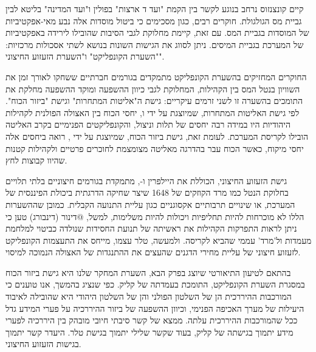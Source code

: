 קיים קונצנזוס נרחב בנוגע לקשר  בין הקמת "ועד ד ארצות" בפולין ו"ועד המדינה" בליטא לבין גביית מס הגולגולת. חוקרים רבים, כגון מסכימים כי ביטול מוסדות אלה נבע מאי-אפקטיביות של המוסדות בגביית המס. עם זאת, קיימת מחלוקת לגבי הסיבות שהובילו לירידה באפקטיביות של המערכת בגביית המיסים. ניתן לסווג את הגישות השונות בנושא לשתי אסכולות מרכזיות: "השערת הקונפליקט" ו"השערת הזעזוע החיצוני".

החוקרים המחזיקים בהשערת הקונפליקט מתמקדים בגורמים חברתיים ששחקו לאורך זמן את השוויון בנטל המס בין הקהילות, המחלוקת לגבי כיוון ההשפעה ומוקד ההשפעה מחלקת את התומכים בהשערה זו לשני זרמים עיקריים: גישת ה"אליטות המתחרות" וגישת "ביזור הכוח". לפי גישת האליטות המתחרות, שמיוצגת על ידי \cite{teller_early_2010-1} ו\cite{kazmierczyk_permanent_2022}, יחסי הכוח בין האצולה הפולנית לקהילות היהודיות היו במידה רבה יחסים של תלות וניצול, והקונפליקטים הפנימיים בקרב האליטה הובילו לקריסת המערכת. לעומת זאת, גישת ביזור הכוח, שמיוצגת על ידי \cite{kalik_scepter_2009}, רואה ביחסים אלה יחסי מיקוח, כאשר הכוח עבר בהדרגה מאליטה מצומצמת לחוכרים פרטיים ולקהילות קטנות שהיוו קבוצות לחץ.

גישת הזעזוע החיצוני, הכוללת את היילפרין ו-\cite{hundert_jews_2004}, מתמקדת בגורמים חיצוניים בלתי תלויים בחלוקת הנטל כמו מרד הקוזקים של 1648 שיצר שחיקה הדרגתית ביכולת הפיננסית של המערכת, או שינויים תרבותיים אקסוגניים כגון עליית התנועה הקבלית. כמובן שההשערות הללו לא מוכרחות להיות תחליפיות ויכולות להיות משלימות, למשל, @דינור (דינבורג) טען כי ניתן לראות התפרקות הקהילות את ראשיתה של תנועת החסידות שנולדה כביטוי למלחמת מעמדות ול'מרד' עממי שהביא לקריסה. ולמעשה, טלר עצמו, מייחס את התעצמות הקונפליקט לזעזוע חיצוני של עליית מחירי הדגנים שהעצים את ההתנגדות של האצולה הנמוכה למיסוי.

בהתאם לטיעון התיאורטי שיוצג בפרק הבא, השערת המחקר שלנו היא גישת ביזור הכוח במסגרת השערת הקונפליקט, התומכת בעמדתה של קליק. כפי שנציג בהמשך, אנו טוענים כי המורכבות ההיררכית הן של השלטון הפולני והן של השלטון היהודי היא שהובילה לאיבוד היעילות של מערך האכיפה הפנימי, וכיוון ההשפעה של ביזור ההיררכיה על פערי המידע גדל ככל שהמורכבות ההיררכית עלתה. ממצא של קשר סיבתי חיובי מובהק בין היררכיה לפערי מידע יתמוך בגישתה של קליק, בעוד שקשר שלילי יתמוך בגישת טלר. היעדר קשר יתמוך בגישות הזעזוע החיצוני.


